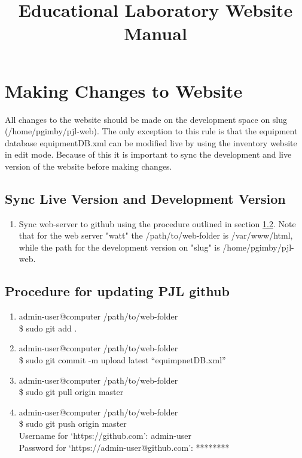 \documentclass[justified]{article}
\begin{document}
\title{Educational Laboratory Website Manual}
\maketitle
\tableofcontents

\section{Making Changes to Website}

All changes to the website should be made on the development space on slug (/home/pgimby/pjl-web). The only exception to this rule is that the equipment database equipmentDB.xml can be modified live by using the inventory website in edit mode. Because of this it is important to sync the development and live version of the website before making changes.

\subsection{Sync Live Version and Development Version}

\begin{enumerate}
\item Sync web-server to github using the procedure outlined in section \ref{proc:sync}. Note that for the web server "watt" the /path/to/web-folder is /var/www/html, while the path for the development version on "slug" is /home/pgimby/pjl-web.
\end{enumerate}


\subsection{Procedure for updating PJL github}\label{proc:sync}


\begin{enumerate}
\item admin-user@computer /path/to/web-folder\\
	\$ sudo git add .
\item admin-user@computer /path/to/web-folder\\
	\$ sudo git commit -m upload latest ``equimpnetDB.xml''
\item admin-user@computer /path/to/web-folder\\
	\$ sudo git pull origin master
\item admin-user@computer /path/to/web-folder\\
	\$ sudo git push origin master\\
	Username for `https://github.com': admin-user\\
	Password for `https://admin-user@github.com': ********
\end{enumerate}
\end{document}
